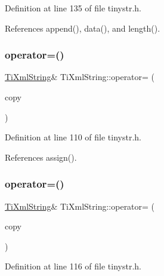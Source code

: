 Definition at line 135 of file tinystr.\+h.



References append(), data(), and length().

\hypertarget{class_ti_xml_string_ae0bc6147afc0ec2aa0da3a3c0a8fcfb0}{}\label{class_ti_xml_string_ae0bc6147afc0ec2aa0da3a3c0a8fcfb0} 
\subsubsection{\texorpdfstring{operator=()}{operator=()}\hspace{0.1cm}{\footnotesize\ttfamily [1/2]}}
{\footnotesize\ttfamily \hyperlink{class_ti_xml_string}{Ti\+Xml\+String}\& Ti\+Xml\+String\+::operator= (\begin{DoxyParamCaption}\item[{const char $\ast$}]{copy }\end{DoxyParamCaption})\hspace{0.3cm}{\ttfamily [inline]}}



Definition at line 110 of file tinystr.\+h.



References assign().

\hypertarget{class_ti_xml_string_ab1f1f5d3eceaa0f22d0a7e6055ea81b0}{}\label{class_ti_xml_string_ab1f1f5d3eceaa0f22d0a7e6055ea81b0} 
\subsubsection{\texorpdfstring{operator=()}{operator=()}\hspace{0.1cm}{\footnotesize\ttfamily [2/2]}}
{\footnotesize\ttfamily \hyperlink{class_ti_xml_string}{Ti\+Xml\+String}\& Ti\+Xml\+String\+::operator= (\begin{DoxyParamCaption}\item[{const \hyperlink{class_ti_xml_string}{Ti\+Xml\+String} \&}]{copy }\end{DoxyParamCaption})\hspace{0.3cm}{\ttfamily [inline]}}



Definition at line 116 of file tinystr.\+h.



